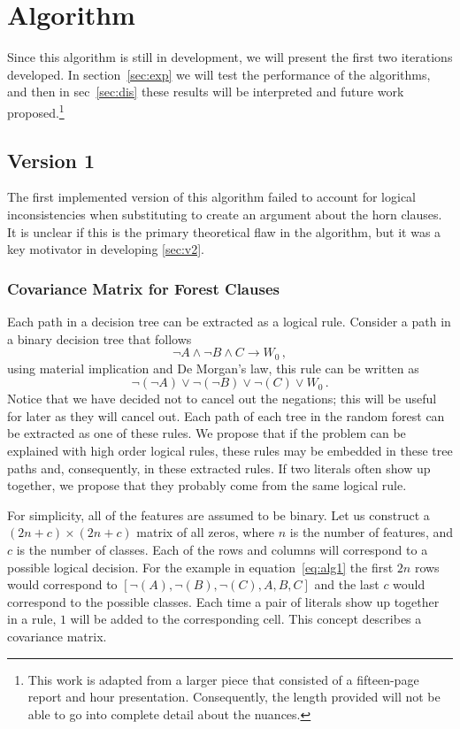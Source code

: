 \documentclass[11pt]{article}
\begin{document}
\section{Algorithm}
\label{sec:alg}
Since this algorithm is still in development, we will present the first two iterations developed. In section~\ref{sec:exp} we will test the performance of the algorithms, and then in sec~\ref{sec:dis} these results will be interpreted and future work proposed.\footnote{This work is adapted from a larger piece that consisted of a fifteen-page report and hour presentation. Consequently, the length provided will not be able to go into complete detail about the nuances.}

\subsection{Version 1}
\label{sec:v1}
The first implemented version of this algorithm failed to account for logical inconsistencies when substituting to create an argument about the horn clauses. It is unclear if this is the primary theoretical flaw in the algorithm, but it was a key motivator in developing \ref{sec:v2}.
\subsubsection{Covariance Matrix for Forest Clauses}
Each path in a decision tree can be extracted as a logical rule. Consider a path in a binary decision tree that follows 
\[\neg A \land \neg B \land C \rightarrow W_0 \, ,\]
using material implication and De Morgan's law, this rule can be written as 
\begin{equation}
\neg(\neg A) \lor \neg (\neg B) \lor \neg(C) \lor W_0 \, .
\label{eq:alg1}
\end{equation}
Notice that we have decided not to cancel out the negations; this will be useful for later as they will cancel out. Each path of each tree in the random forest can be extracted as one of these rules. We propose that if the problem can be explained with high order logical rules, these rules may be embedded in these tree paths and, consequently, in these extracted rules. If two literals often show up together, we propose that they probably come from the same logical rule.  

For simplicity, all of the features are assumed to be binary. Let us construct a $(2n +c) \times (2n+c)$ matrix of all zeros, where $n$ is the number of features, and $c$ is the number of classes. Each of the rows and columns will correspond to a possible logical decision. For the example in equation~\ref{eq:alg1} the first $2n$ rows would correspond to $[\neg(A), \neg(B), \neg(C), A, B, C]$ and the last $c$ would correspond to the possible classes. Each time a pair of literals show up together in a rule, $1$ will be added to the corresponding cell. This concept describes a covariance matrix.
\end{document}
